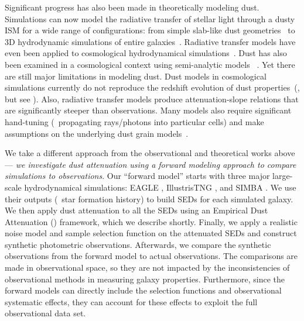 Significant progress has also been made in theoretically modeling dust. 
Simulations can now model the radiative transfer of stellar light
through a dusty ISM for a wide range of configurations:
from simple slab-like dust geometries~\citep[\eg][]{witt1996, witt2000,
seon2016} to 
3D hydrodynamic simulations of entire galaxies~\citep[\eg][]{jonsson2006,
rocha2008, hayward2015, natale2015, hou2017}. 
Radiative transfer models have even been applied to cosmological
hydrodynamical simulations~\cite[\eg][]{camps2015, narayanan2018,
cochrane2019, rodriguez-gomez2019, trayford2020}. 
Dust has also been examined in a cosmological context using 
semi-analytic models ~\citep[SAMs; \eg][]{granato2000, fontanot2009, wilkins2012,
gonzalez-perez2013, popping2017}. 
Yet there are still major limitations in modeling dust. 
Dust models in cosmological simulations currently do not reproduce the
redshift evolution of dust properties~(\citealp{somerville2012, yung2019,
vogelsberger2020}, but see \citealp{li2019}). 
Also, radiative transfer models produce attenuation-slope relations that are
significantly steeper than observations.  %
Many models also require significant hand-tuning (\eg~propagating rays/photons into
particular cells) and make assumptions on the underlying dust grain models~\citep[see][for a review]{steinacker2013}. 

We take a different approach from the observational and theoretical works
above --- \emph{we investigate dust attenuation using a forward modeling
approach to compare simulations to observations}.
Our ``forward model'' starts with three major large-scale hydrodynamical
simulations: EAGLE \citep{schaye2015}, IllustrisTNG \citep{nelson2019},
and SIMBA \citep{dave2019}. 
We use their outputs (\eg~star formation history) to build SEDs for each
simulated galaxy.
We then apply dust attenuation to all the SEDs using an Empirical Dust
Attenuation (\eda) framework, which we describe shortly.
Finally, we apply a realistic noise model and sample selection function on
the attenuated SEDs and construct synthetic photometric observations. 
Afterwards, we compare the synthetic observations from the forward model to
actual observations. 
The comparisons are made in observational space, so they are not impacted
by the inconsistencies of observational methods in measuring galaxy
properties.
Furthermore, since the forward models can directly include the selection
functions and observational systematic effects, they can account for these
effects to exploit the full observational data set.

